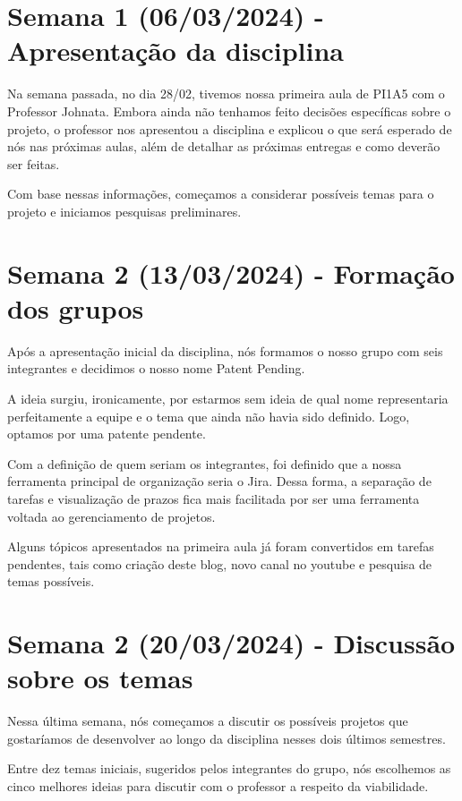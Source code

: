 \label{ap:A}

\section{Semana 1 (06/03/2024) - Apresentação da disciplina }
Na semana passada, no dia 28/02, tivemos nossa primeira aula de PI1A5 com o Professor Johnata. Embora ainda não tenhamos feito decisões específicas sobre o projeto, o professor nos apresentou a disciplina e explicou o que será esperado de nós nas próximas aulas, além de detalhar as próximas entregas e como deverão ser feitas. 

Com base nessas informações, começamos a considerar possíveis temas para o projeto e iniciamos pesquisas preliminares.

\section{Semana 2 (13/03/2024) - Formação dos grupos }

 Após a apresentação inicial da disciplina, nós formamos o nosso grupo com seis integrantes e decidimos o nosso nome Patent Pending.

A ideia surgiu, ironicamente, por estarmos sem ideia de qual nome representaria perfeitamente a equipe e o tema que ainda não havia sido definido. Logo, optamos por uma patente pendente.

Com a definição de quem seriam os integrantes, foi definido que a nossa ferramenta principal de organização seria o Jira. Dessa forma, a separação de tarefas e visualização de prazos fica mais facilitada por ser uma ferramenta voltada ao gerenciamento de projetos.

Alguns tópicos apresentados na primeira aula já foram convertidos em tarefas pendentes, tais como criação deste blog, novo canal no youtube e pesquisa de temas possíveis.

\section{Semana 2 (20/03/2024) -  Discussão sobre os temas }
Nessa última semana, nós começamos a discutir os possíveis projetos que gostaríamos de desenvolver ao longo da disciplina nesses dois últimos semestres.

Entre dez temas iniciais, sugeridos pelos integrantes do grupo, nós escolhemos as cinco melhores ideias para discutir com o professor a respeito da viabilidade.

